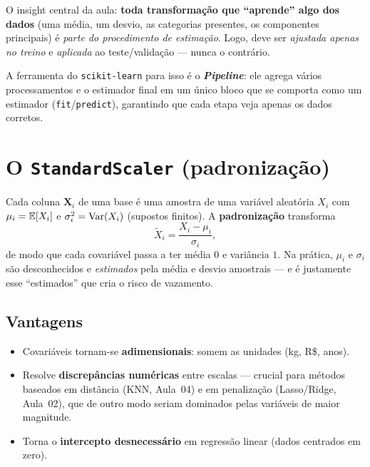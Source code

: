 \documentclass[11pt,a4paper]{article}
\begin{document}
\begin{ideia}
O insight central da aula: \textbf{toda transformação que ``aprende'' algo dos
dados} (uma média, um desvio, as categorias presentes, os componentes principais)
é \emph{parte do procedimento de estimação}. Logo, deve ser \emph{ajustada apenas
no treino} e \emph{aplicada} ao teste/validação --- nunca o contrário.
\end{ideia}

A ferramenta do \texttt{scikit-learn} para isso é o \textbf{\emph{Pipeline}}: ele
agrega vários processamentos e o estimador final em um único bloco que se comporta
como um estimador (\texttt{fit}/\texttt{predict}), garantindo que cada etapa veja
apenas os dados corretos.

\section{O \texttt{StandardScaler} (padronização)}
Cada coluna $\bm{X}_i$ de uma base é uma amostra de uma variável aleatória $X_i$ com
$\mu_i=\mathbb{E}[X_i]$ e $\sigma_i^2=\operatorname{Var}(X_i)$ (supostos finitos). A \textbf{padronização}
transforma
\begin{equation}\label{eq:std}
  \widetilde{X}_i = \frac{X_i - \mu_i}{\sigma_i},
\end{equation}
de modo que cada covariável passa a ter média $0$ e variância $1$. Na prática,
$\mu_i$ e $\sigma_i$ são desconhecidos e \emph{estimados} pela média e desvio
amostrais --- e é justamente esse ``estimados'' que cria o risco de vazamento.

\subsection{Vantagens}
\begin{itemize}[leftmargin=1.4cm,nosep]
  \item Covariáveis tornam-se \textbf{adimensionais}: somem as unidades (kg, R\$,
        anos).
  \item Resolve \textbf{discrepâncias numéricas} entre escalas --- crucial para
        métodos baseados em distância (KNN, Aula~04) e em penalização
        (Lasso/Ridge, Aula~02), que de outro modo seriam dominados pelas variáveis
        de maior magnitude.
  \item Torna o \textbf{intercepto desnecessário} em regressão linear (dados
        centrados em zero).
\end{itemize}
\end{document}
